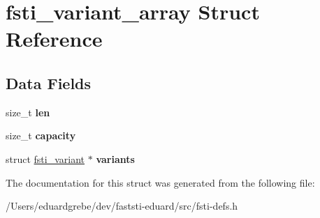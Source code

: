 \hypertarget{structfsti__variant__array}{}\section{fsti\+\_\+variant\+\_\+array Struct Reference}
\label{structfsti__variant__array}
\subsection*{Data Fields}
\begin{DoxyCompactItemize}
\item 
\mbox{\label{structfsti__variant__array_a39cfdcdfbafab25eecf67428eb070030}} 
size\+\_\+t {\bfseries len}
\item 
\mbox{\label{structfsti__variant__array_a73ea0e7e2dd113ab36f38f1dfeac1cc1}} 
size\+\_\+t {\bfseries capacity}
\item 
\mbox{\label{structfsti__variant__array_a1dfd401c440b5b040c3ff373c3f04930}} 
struct \mbox{\hyperlink{structfsti__variant}{fsti\+\_\+variant}} $\ast$ {\bfseries variants}
\end{DoxyCompactItemize}


The documentation for this struct was generated from the following file\+:\begin{DoxyCompactItemize}
\item 
/\+Users/eduardgrebe/dev/faststi-\/eduard/src/fsti-\/defs.\+h\end{DoxyCompactItemize}
